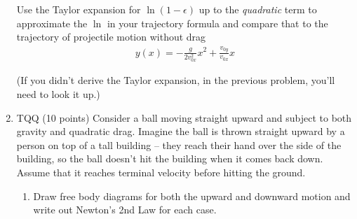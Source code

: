 \documentclass[12pt]{article}
\begin{document}
\begin{enumerate}
   Use the Taylor expansion for $\ln(1-\epsilon)$ up to the \textit{quadratic} term to approximate the $\ln$ in your trajectory formula and compare that to the trajectory of projectile motion without drag
    \begin{align}
      y(x) = -\frac{g}{2v_{0x}^2} x^2 + \frac{v_{0y}}{v_{0x}} x
      \end{align}

      (If you didn't derive the Taylor expansion, in the previous problem, you'll need to look it up.)



      \item TQQ (10 points) Consider a ball moving straight upward and subject to both gravity and quadratic drag. Imagine the ball is thrown straight upward by a person on top of a tall building -- they reach their hand over the side of the building, so the ball doesn't hit the building when it comes back down. Assume that it reaches terminal velocity before hitting the ground.

      \begin{enumerate}
        \item Draw free body diagrams for both the upward and downward motion and write out Newton's 2nd Law for each case.



\end{enumerate}
\end{enumerate}
\end{document}
